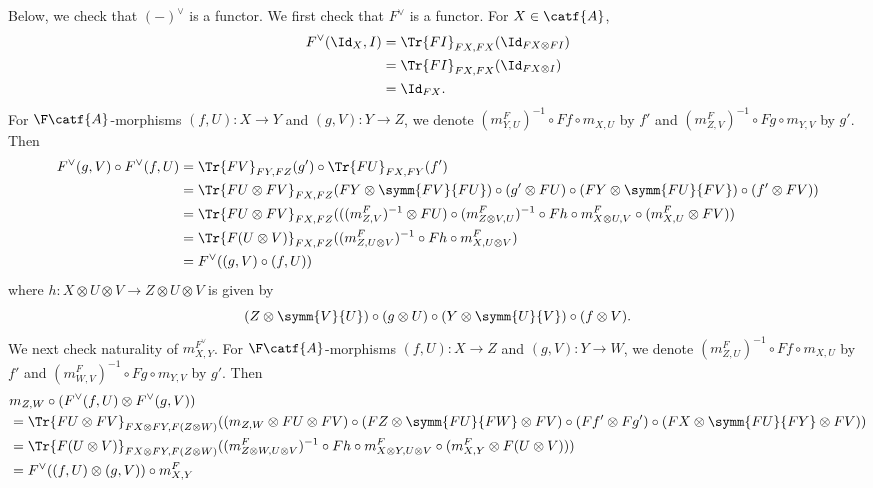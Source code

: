 Below, we check that \((-)^{\vee}\) is a functor.
We first check that \(F^{\vee}\) is a functor. For \(X \in \catf{A}\),
\begin{align*}
  F^{\vee}(\Id_{X},I)
  &= \Tr{FI}_{FX,FX}(\Id_{FX \otimes FI}) \\
  &= \Tr{FI}_{FX,FX}(\Id_{FX \otimes I}) \\
  &= \Id_{FX}.
\end{align*}
For \(\F\catf{A}\)-morphisms \((f,U) \colon X \to Y\) and \((g,V)
\colon Y \to Z\), we denote \((m_{Y,U}^{F})^{-1} \circ Ff \circ
m_{X,U}\) by \(f'\) and \((m_{Z,V}^{F})^{-1} \circ Fg \circ m_{Y,V}\)
by \(g'\). Then
\begin{align*}
  F^{\vee}(g,V) \circ F^{\vee}(f,U)
  &= \Tr{FV}_{FY,FZ}(g') \circ \Tr{FU}_{FX,FY}(f') \\
  &= \Tr{FU \otimes FV}_{FX,FZ}(FY \otimes \symm{FV}{FU}) \circ
  (g' \otimes FU) \circ (FY \otimes \symm{FU}{FV}) \circ (f' \otimes FV)) \\
  &= \Tr{FU \otimes FV}_{FX,FZ}(((m_{Z,V}^{F})^{-1} \otimes FU) \circ
  (m_{Z \otimes V,U}^{F})^{-1} \circ
  Fh \circ m_{X \otimes U,V}^{F} \circ (m_{X,U}^{F} \otimes FV)) \\
  &= \Tr{F(U \otimes V)}_{FX,FZ}((m_{Z,U \otimes V}^{F})^{-1} \circ
  Fh \circ m_{X, U \otimes V}^{F}) \\
  &= F^{\vee}((g,V) \circ (f,U))
\end{align*}
where \(h \colon X \otimes U \otimes V \to Z \otimes U \otimes V\) is given by
\begin{equation*}
  (Z \otimes \symm{V}{U}) \circ (g \otimes U) \circ (Y \otimes \symm{U}{V})
  \circ (f \otimes V).
\end{equation*}
We next check naturality of \(m^{F^{\vee}}_{X,Y}\). For
\(\F\catf{A}\)-morphisms \((f,U) \colon X \to Z\) and \((g,V) \colon Y
\to W\), we denote \((m_{Z,U}^{F})^{-1} \circ Ff \circ m_{X,U}\) by
\(f'\) and \((m_{W,V}^{F})^{-1} \circ Fg \circ m_{Y,V}\) by \(g'\). Then
\begin{align*}
  &m_{Z,W} \circ (F^{\vee}(f,U) \otimes F^{\vee}(g,V)) \\
  &= \Tr{FU \otimes FV}_{FX \otimes FY,F(Z \otimes W)}
  ((m_{Z,W} \otimes FU \otimes FV) \circ
  (FZ \otimes \symm{FU}{FW} \otimes FV) \circ
  (Ff' \otimes Fg') \circ
  (FX \otimes \symm{FU}{FY} \otimes FV)) \\
  &= \Tr{F(U \otimes V)}_{FX \otimes FY,F(Z \otimes W)}
  ((m_{Z \otimes W, U \otimes V}^{F})^{-1} \circ
  Fh \circ
  m_{X \otimes Y, U \otimes V}^{F} \circ
  (m_{X,Y}^{F} \otimes F(U \otimes V))) \\
  &= F^{\vee}((f,U) \otimes (g,V)) \circ m^{F}_{X,Y}
\end{align*}
